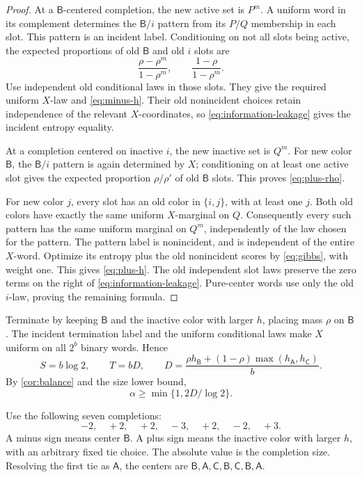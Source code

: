 \documentclass[11pt]{article}
\numberwithin{equation}{section}
\theoremstyle{definition}
\theoremstyle{remark}
\newcommand{\colA}{\mathsf A}
\newcommand{\colB}{\mathsf B}
\newcommand{\colC}{\mathsf C}
\begin{document}
\begin{proof}
At a \(\colB\)-centered completion, the new active set is \(P^m\).
A uniform word in its complement determines the \(\colB/i\) pattern
from its \(P/Q\) membership in each slot.
This pattern is an incident label.
Conditioning on not all slots being active, the expected proportions
of old \(\colB\) and old \(i\) slots are
\[
 \frac{\rho-\rho^m}{1-\rho^m},
 \qquad \frac{1-\rho}{1-\rho^m}.
\]
Use independent old conditional laws in those slots.
They give the required uniform \(X\)-law and
\eqref{eq:minus-h}.
Their old nonincident choices retain independence of the relevant
\(X\)-coordinates, so \eqref{eq:information-leakage} gives the incident
entropy equality.

At a completion centered on inactive \(i\), the new inactive set is
\(Q^m\).  For new color \(\colB\), the \(\colB/i\) pattern is again
determined by \(X\); conditioning on at least one active slot gives
the expected proportion \(\rho/\rho'\) of old \(\colB\) slots.
This proves \eqref{eq:plus-rho}.

For new color \(j\), every slot has an old color in \(\{i,j\}\), with
at least one \(j\).
Both old colors have exactly the same uniform \(X\)-marginal on \(Q\).
Consequently every such pattern has the same uniform marginal on
\(Q^m\), independently of the law chosen for the pattern.
The pattern label is nonincident, and is independent of the entire
\(X\)-word.
Optimize its entropy plus the old nonincident scores by
\eqref{eq:gibbs}, with weight one.
This gives \eqref{eq:plus-h}.
The old independent slot laws preserve the zero terms on the right
of \eqref{eq:information-leakage}.
Pure-center words use only the old \(i\)-law, proving the remaining
formula.
\end{proof}

Terminate by keeping \(\colB\) and the inactive color with larger \(h\),
placing mass \(\rho\) on \(\colB\).
The incident termination label and the uniform conditional laws make
\(X\) uniform on all \(2^b\) binary words.
Hence
\begin{equation}\label{eq:flat-rates}
 S=b\log2,\qquad
 T=bD,\qquad
 D=\frac{\rho h_{\colB}+(1-\rho)\max(h_{\colA},h_{\colC})}{b}.
\end{equation}
By \cref{cor:balance} and the size lower bound,
\begin{equation}\label{eq:alpha-certificate}
 \alpha\ge \min\{1,2D/\log2\}.
\end{equation}

Use the following seven completions:
\begin{equation}\label{eq:dual-script}
 -2,\quad +2,\quad +2,\quad -3,\quad +2,\quad -2,\quad +3.
\end{equation}
A minus sign means center \(\colB\).
A plus sign means the inactive color with larger \(h\), with an
arbitrary fixed tie choice.
The absolute value is the completion size.
Resolving the first tie as \(\colA\), the centers are
\(\colB,\colA,\colC,\colB,\colC,\colB,\colA\).
\end{document}
